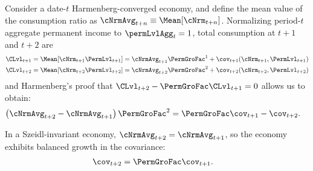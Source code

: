 \documentclass[BufferStockTheory]{subfiles}
\begin{document}
Consider a date-$t$ Harmenberg-converged economy, and define the mean value of the consumption ratio as $\cNrmAvg_{t+n} \equiv \Mean[\cNrm_{t+n}]$.  Normalizing period-$t$ aggregate permanent income to $\permLvlAgg_{t}=1$, total consumption at $t+1$ and $t+2$ are
\begin{equation}\label{eq:atp2vsatp1}
  \begin{split}
    \CLvl_{t+1} & = \Mean[\cNrm_{t+1}\PermLvl_{t+1}] = \cNrmAvg_{t+1}\PermGroFac^{1} + \cov_{t+1}(\cNrm_{t+1}, \PermLvl_{t+1})
    \\  \CLvl_{t+2} & = \Mean[\cNrm_{t+2}\PermLvl_{t+2}] = \cNrmAvg_{t+2}\PermGroFac^{2} + \cov_{t+2}(\cNrm_{t+2}, \PermLvl_{t+2})
  \end{split}
\end{equation}
and Harmenberg's proof that $\CLvl_{t+2}-\PermGroFac \CLvl_{t+1}=0$ allows us to obtain:
\begin{equation} \label{eq:cNrmvsCov}\begin{split}
    \left(\cNrmAvg_{t+2} - \cNrmAvg_{t+1}\right)\PermGroFac^{2} & = \PermGroFac \cov_{t+1} - \cov_{t+2} .
  \end{split}\end{equation}

In a Szeidl-invariant economy, $\cNrmAvg_{t+2} = \cNrmAvg_{t+1}$, so the economy exhibits balanced growth in the covariance:
\begin{align}
  \cov_{t+2} & = \PermGroFac \cov_{t+1}.
\end{align}
\end{document}
